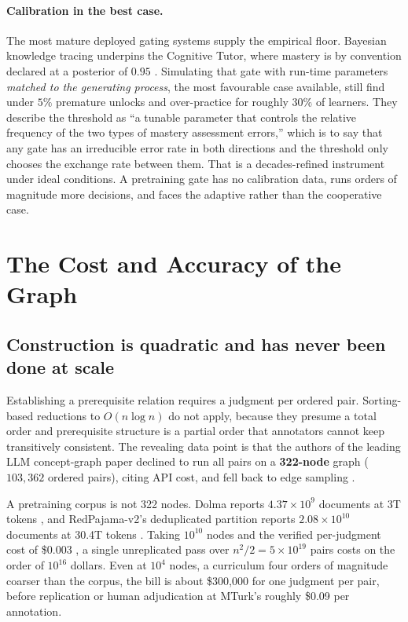 \documentclass[11pt]{article}
\theoremstyle{plain}
\theoremstyle{definition}
\theoremstyle{remark}
\begin{document}
\paragraph{Calibration in the best case.} The most mature deployed gating systems
supply the empirical floor. Bayesian knowledge tracing
\citep{corbett1995knowledge} underpins the Cognitive Tutor, where mastery is by
convention declared at a posterior of $0.95$ \citep{fancsali2013optimal}.
Simulating that gate with run-time parameters \emph{matched to the generating
process}, the most favourable case available, \citet{fancsali2013optimal}
still find under $5\%$ premature unlocks and
over-practice for roughly $30\%$ of learners. They describe the threshold as ``a
tunable parameter that controls the relative frequency of the two types of
mastery assessment errors,'' which is to say that any gate has an irreducible
error rate in both directions and the threshold only chooses the exchange rate
between them. That is a decades-refined
instrument under ideal conditions. A pretraining gate has no calibration data,
runs orders of magnitude more decisions, and faces the adaptive rather than the
cooperative case.

\section{The Cost and Accuracy of the Graph}
\label{sec:graphcost}

\subsection{Construction is quadratic and has never been done at scale}

Establishing a prerequisite relation requires a judgment per ordered pair.
Sorting-based reductions to $O(n \log n)$ do not apply, because they presume a
total order and prerequisite structure is a partial order that annotators cannot
keep transitively consistent. The revealing data point is that the authors of the
leading LLM concept-graph paper declined to run all pairs on a \textbf{322-node}
graph ($103{,}362$ ordered pairs), citing API cost, and fell back to edge
sampling \citep{yang2024cgprompt}.

A pretraining corpus is not 322 nodes. Dolma reports $4.37 \times 10^9$ documents
at 3T tokens \citep{soldaini2024dolma}, and RedPajama-v2's deduplicated partition
reports $2.08 \times 10^{10}$ documents at 30.4T tokens \citep{weber2024redpajama}.
Taking $10^{10}$ nodes and the verified per-judgment cost of \$0.003
\citep{gilardi2023chatgpt}, a single unreplicated pass over $n^2/2 = 5 \times
10^{19}$ pairs costs on the order of $10^{16}$ dollars. Even at $10^4$ nodes, a
curriculum four orders of magnitude coarser than the corpus, the bill is about
\$300{,}000 for one judgment per pair, before replication or human adjudication
at MTurk's roughly \$0.09 per annotation.
\end{document}
